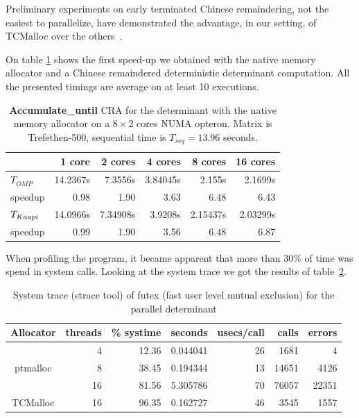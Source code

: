 \documentclass{article}
\newcommand{\kaapi}{{\sc Kaapi}\xspace}
\newcommand{\Accumulatewhile}{ \textbf{Accumulate\_until} }
\begin{document}
Preliminary experiments on early terminated Chinese remaindering,
not the easiest to parallelize, have demonstrated the advantage, in
our setting, of TCMalloc over the others~\cite{jgd:2010:crt}.

On table \ref{tab:ptmalloc} shows the first speed-up we obtained with
the native memory allocator and a Chinese remaindered deterministic
determinant computation. All the presented timings are average on at
least 10 executions.

\begin{table}[htb]\center
\begin{tabular}{|l||r|r|r|r|r|}
\hline
& 1 core & 2 cores & 4 cores & 8 cores & 16 cores\\
\hline
$T_{OMP}$ &14.2367s& 7.3556s& 3.84045s& 2.155s& 2.1699s\\
speedup& 0.98& 1.90& 3.63& 6.48& 6.43\\
\hline
$T_{\kaapi}$ & 14.0966s& 7.34908s& 3.9208s& 2.15437s& 2.03299s\\
speedup& 0.99& 1.90& 3.56& 6.48& 6.87\\
\hline
\end{tabular}
\caption{\Accumulatewhile CRA for the determinant with the native
  memory allocator on a $8\times 2$ cores NUMA opteron. Matrix is
  Trefethen-500, sequential time is $T_{seq}=13.96$ seconds.
}\label{tab:ptmalloc}
\end{table}

When profiling the program, it became apparent that more than 30\% of
time was spend in system calls. Looking at the system trace we got the
results of table~\ref{tab:futex}.

\begin{table}[htb]\center
\begin{tabular}{|c|r||r|r|r|r|r|}
\hline
Allocator& threads& \% systime & seconds & usecs/call & calls & errors\\
\hline
\multirow{3}{*}{ptmalloc}& 4& 12.36 &0.044041 &26 &1681& 4\\
&8& 38.45 &0.194344 &13 &14651& 4126\\
&16&81.56 &5.305786 &70 &76057& 22351\\
\hline
TCMalloc& 16& 96.35& 0.162727& 46& 3545& 1557\\
\hline
\end{tabular}
\caption{System trace (strace tool) of futex (fast user level mutual
  exclusion) for the parallel determinant}\label{tab:futex}
\end{table}
\end{document}
